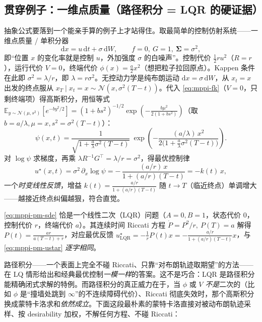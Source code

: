 \subsection{贯穿例子：一维点质量（路径积分 = LQR 的硬证据）}
\label{sec:mppi-pointmass}

抽象公式要落到一个能亲手算的例子上才站得住。取最简单的控制仿射系统——一维点质量 / 单积分器
\begin{equation}
  \mathrm{d}x=u\,\mathrm{d}t+\sigma\,\mathrm{d}W,\qquad f=0,\ G=1,\ \boldsymbol{\Sigma}=\sigma^2,
  \label{eq:mppi-pm-sde}
\end{equation}
即“位置 $x$ 的变化率就是控制 $u$，外加强度 $\sigma$ 的白噪声”。控制代价 $\tfrac12 r u^2$（$R=r$），运行代价 $V=0$，终端代价 $\phi(x)=\tfrac{a}{2}x^2$（想把粒子拉回原点）。Kappen 条件在此即 $\sigma^2=\lambda/r$，即 $\lambda=r\sigma^2$。无控动力学是纯布朗运动 $\mathrm{d}x=\sigma\,\mathrm{d}W$，从 $x_t=x$ 出发的终点服从 $x_T\mid x_t=x\sim\mathcal{N}(x,\sigma^2(T-t))$。代入 \cref{eq:mppi-fk}（$V=0$，只剩终端项）得高斯积分，用恒等式 $\mathbb{E}_{y\sim\mathcal{N}(\mu,s^2)}[e^{-by^2/2}]=(1+bs^2)^{-1/2}\exp(-\tfrac{b\mu^2}{2(1+bs^2)})$（取 $b=a/\lambda,\mu=x,s^2=\sigma^2(T-t)$）：
\begin{equation}
  \psi(x,t)=\frac{1}{\sqrt{1+\tfrac{a}{\lambda}\sigma^2(T-t)}}\ \exp\!\left(-\frac{(a/\lambda)\,x^2}{2\big(1+\tfrac{a}{\lambda}\sigma^2(T-t)\big)}\right).
  \label{eq:mppi-pm-psi}
\end{equation}
对 $\log\psi$ 求梯度，再乘 $\lambda R^{-1}G^\top=\lambda/r=\sigma^2$，得最优控制律
\begin{equation}
  u^\star(x,t)=\sigma^2\,\partial_x\log\psi=-\,\frac{(a/r)\,x}{1+(a/r)(T-t)}=-k(t)\,x,
  \label{eq:mppi-pm-ustar}
\end{equation}
一个\emph{时变线性反馈}，增益 $k(t)=\tfrac{a/r}{1+(a/r)(T-t)}$ 随 $t\to T$（临近终点）单调增大——越接近终点纠偏越狠，符合直觉。

\begin{theorem}\label{thm:mppi-lqr}
\cref{eq:mppi-pm-sde} 恰是一个线性二次（LQR）问题（$A=0,B=1$，状态代价 $0$，控制代价 $r$，终端代价 $a$）。其连续时间 Riccati 方程 $\dot P=P^2/r,\ P(T)=a$ 解得 $P(t)=\tfrac{ar}{a(T-t)+r}$，对应最优反馈 $u^\star_{\mathrm{LQR}}=-\tfrac1r P(t)x=-\tfrac{a/r}{1+(a/r)(T-t)}x$，与 \cref{eq:mppi-pm-ustar} \emph{逐字相同}。
\end{theorem}

\noindent 路径积分——一个表面上完全不碰 Riccati、只靠“对布朗轨迹取期望”的方法——在 LQ 情形给出和经典最优控制\emph{一模一样}的答案。这不是巧合：LQR 是路径积分能精确闭式求解的特例。而路径积分的真正威力在于，当 $\phi$ 或 $V$ \emph{不是}二次的（比如 $\phi$ 是“撞墙处跳到 $\infty$”的不连续障碍代价）、Riccati 彻底失效时，那个高斯积分换成蒙特卡洛求和\emph{依然成立}。下面这段最朴素的蒙特卡洛直接对被动布朗轨迹采样、按 desirability 加权，不解任何方程、不碰 Riccati：

